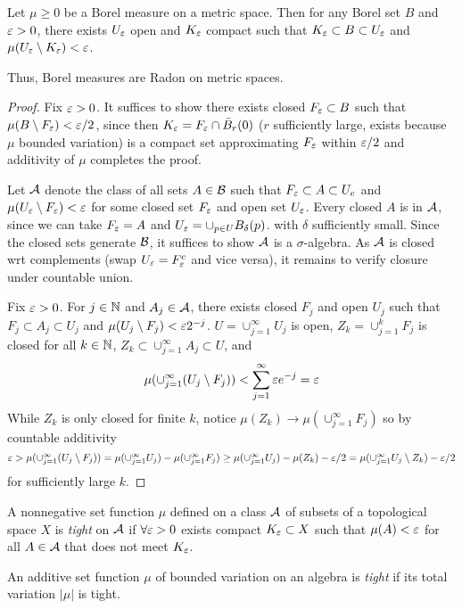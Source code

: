 \begin{theorem}
  \label{thm:inner-approx-compact-Rn}
  Let $\mu \geq 0$ be a Borel measure on a metric space.
  Then for any Borel set $B$ and $\varepsilon > 0$,
  there exists $U_\varepsilon$ open and $K_\varepsilon$ compact such that
  $K_\varepsilon \subset B \subset U_\varepsilon$ and $\mu(U_\varepsilon \setminus K_\varepsilon) < \varepsilon$.

  Thus, Borel measures are Radon on metric spaces.
\end{theorem}

\begin{proof}
  Fix $\varepsilon > 0$. It suffices to show there exists closed $F_\varepsilon \subset B$
  such that $\mu(B \setminus F_\varepsilon) < \varepsilon / 2$, since then
  $K_\varepsilon = F_\varepsilon \cap \bar{B}_r(0)$ ($r$ sufficiently large, exists because
  $\mu$ bounded variation) is a compact
  set approximating $F_\varepsilon$ within $\varepsilon/2$ and additivity of $\mu$
  completes the proof.

  Let $\mathcal{A}$ denote the class of all sets $A \in \mathcal{B}$ such that
  $F_\varepsilon \subset A \subset U_e$ and $\mu(U_\varepsilon \setminus F_\varepsilon) < \varepsilon$
  for some closed set $F_\varepsilon$ and open set $U_\varepsilon$.
  Every closed $A$ is in $\mathcal{A}$, since we can take
  $F_\varepsilon = A$ and $U_\varepsilon = \cup_{p \in U} B_\delta(p)$.
  with $\delta$ sufficiently small.
  Since the closed sets generate $\mathcal{B}$, it suffices to show $\mathcal{A}$ is
  a $\sigma$-algebra.
  As $\mathcal{A}$ is closed wrt complements (swap $U_\varepsilon = F_\varepsilon^c$ and vice versa),
  it remains to verify closure under countable union.

  Fix $\varepsilon > 0$.
  For $j \in \mathbb{N}$ and $A_j \in \mathcal{A}$, there exists closed $F_j$ and open $U_j$
  such that $F_j \subset A_j \subset U_j$
  and $\mu(U_j \setminus F_j) < \varepsilon 2^{-j}$.
  $U = \cup_{j=1}^\infty U_j$ is open,
  $Z_k = \cup_{j=1}^k F_j$ is closed for all $k \in \mathbb{N}$,
  $Z_k \subset \cup_{j=1}^\infty A_j \subset U$,
  and
  \[
    \mu(\cup_{j=1}^\infty (U_j \setminus F_j))
    < \sum_{j=1}^\infty \varepsilon e^{-j} = \varepsilon
  \]
  While $Z_k$ is only closed for finite $k$, notice
  $\mu(Z_k) \to \mu(\cup_{j=1}^\infty F_j)$ so by countable
  additivity
  \[
    \varepsilon
    > \mu(\cup_{j=1}^\infty (U_j \setminus F_j))
    = \mu(\cup_{j=1}^\infty U_j) - \mu( \cup_{j=1}^\infty F_j)
    \geq \mu(\cup_{j=1}^\infty U_j) - \mu( Z_k ) - \varepsilon/2
    = \mu(\cup_{j=1}^\infty U_j \setminus Z_k) - \varepsilon/2
  \]
  for sufficiently large $k$.
\end{proof}

\begin{definition}
  A nonnegative set function $\mu$
  defined on a class $\mathcal{A}$ of subsets of a topological space $X$
  is \emph{tight} on $\mathcal{A}$ if
  $\forall \varepsilon > 0$ exists compact
  $K_\varepsilon \subset X$ such that $\mu(A) < \varepsilon$ for all $A \in \mathcal{A}$
  that does not meet $K_\varepsilon$.

  An additive set function $\mu$ of bounded variation on an algebra is
  \emph{tight} if its total variation $\lvert \mu \rvert$ is tight.
\end{definition}

